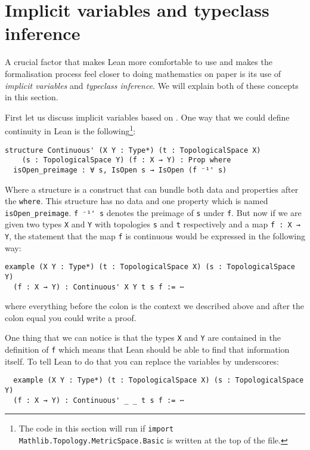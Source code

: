 \section{Implicit variables and typeclass inference}
\label{sec:implicitandtypeclass}

A crucial factor that makes Lean more comfortable to use and makes the formalisation process feel closer to doing mathematics on paper is its use of \emph{implicit variables} and \emph{typeclass inference}. 
We will explain both of these concepts in this section.

First let us discuss implicit variables based on \cite{Avigad2024}. 
One way that we could define continuity in Lean is the following\cprotect\footnote{The code in this section will run if \lstinline{import Mathlib.Topology.MetricSpace.Basic} is written at the top of the file.}:

\begin{lstlisting}
structure Continuous' (X Y : Type*) (t : TopologicalSpace X) 
    (s : TopologicalSpace Y) (f : X → Y) : Prop where
  isOpen_preimage : ∀ s, IsOpen s → IsOpen (f ⁻¹' s)
\end{lstlisting}

Where a structure is a construct that can bundle both data and properties after the \lstinline{where}. 
This structure has no data and one property which is named \lstinline{isOpen_preimage}. 
\lstinline{f ⁻¹' s} denotes the preimage of \lstinline{s} under \lstinline{f}.
But now if we are given two types \lstinline{X} and \lstinline{Y} with topologies \lstinline{s} and \lstinline{t} respectively and a map \lstinline{f : X → Y}, the statement that the map \lstinline{f} is continuous would be expressed in the following way:

\begin{lstlisting}
example (X Y : Type*) (t : TopologicalSpace X) (s : TopologicalSpace Y) 
  (f : X → Y) : Continuous' X Y t s f := ⋯
\end{lstlisting}

where everything before the colon is the context we described above and after the colon equal you could write a proof.

One thing that we can notice is that the types \lstinline{X} and \lstinline{Y} are contained in the definition of \lstinline{f} which means that Lean should be able to find that information itself. 
To tell Lean to do that you can replace the variables by underscores: 

\begin{lstlisting}
  example (X Y : Type*) (t : TopologicalSpace X) (s : TopologicalSpace Y) 
  (f : X → Y) : Continuous' _ _ t s f := ⋯
\end{lstlisting}

